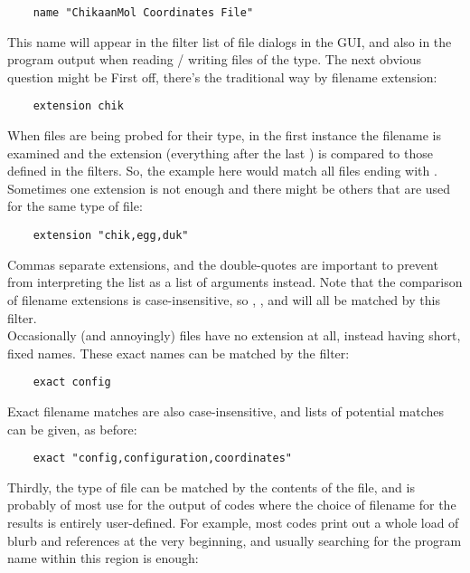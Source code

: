 \begin{verbatim}
	name "ChikaanMol Coordinates File"
\end{verbatim}

This name will appear in the filter list of file dialogs in the GUI, and also in the program output when reading / writing files of the type. The next obvious question might be  First off, there's the traditional way by filename extension:

\begin{verbatim}
	extension chik
\end{verbatim}

When files are being probed for their type, in the first instance the filename is examined and the extension (everything after the last ) is compared to those defined in the filters. So, the example here would match all files ending with . Sometimes one extension is not enough and there might be others that are used for the same type of file:

\begin{verbatim}
	extension "chik,egg,duk"
\end{verbatim}

Commas separate extensions, and the double-quotes are important to prevent \progname{} from interpreting the list as a list of arguments instead. Note that the comparison of filename extensions is case-insensitive, so , , and  will all be matched by this filter.\\

Occasionally (and annoyingly) files have no extension at all, instead having short, fixed names. These exact names can be matched by the filter:

\begin{verbatim}
	exact config
\end{verbatim}

Exact filename matches are also case-insensitive, and lists of potential matches can be given, as before:

\begin{verbatim}
	exact "config,configuration,coordinates"
\end{verbatim}

Thirdly, the type of file can be matched by the contents of the file, and is probably of most use for the output of codes where the choice of filename for the results is entirely user-defined. For example, most codes print out a whole load of blurb and references at the very beginning, and usually searching for the program name within this region is enough:

